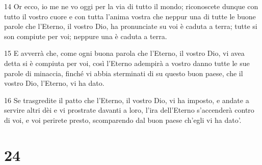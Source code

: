 \par 14 Or ecco, io me ne vo oggi per la via di tutto il mondo; riconoscete dunque con tutto il vostro cuore e con tutta l'anima vostra che neppur una di tutte le buone parole che l'Eterno, il vostro Dio, ha pronunciate su voi è caduta a terra; tutte si son compiute per voi; neppure una è caduta a terra.
\par 15 E avverrà che, come ogni buona parola che l'Eterno, il vostro Dio, vi avea detta si è compiuta per voi, così l'Eterno adempirà a vostro danno tutte le sue parole di minaccia, finché vi abbia sterminati di su questo buon paese, che il vostro Dio, l'Eterno, vi ha dato.
\par 16 Se trasgredite il patto che l'Eterno, il vostro Dio, vi ha imposto, e andate a servire altri dèi e vi prostrate davanti a loro, l'ira dell'Eterno s'accenderà contro di voi, e voi perirete presto, scomparendo dal buon paese ch'egli vi ha dato'.

\chapter{24}

